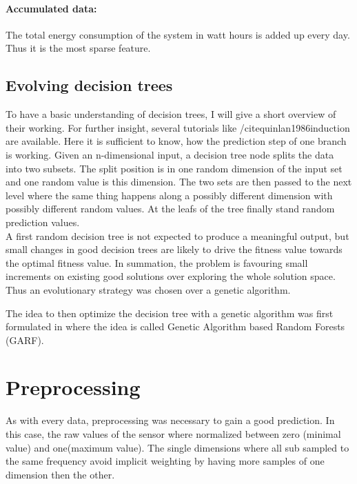 \documentclass[conference]{IEEEtran}
\begin{document}
\paragraph{Accumulated data:}
The total energy consumption of the system  in watt hours is added up every day. Thus it is the most sparse feature.


\subsection{Evolving decision trees}
\label{sec:GARF}

To have a basic understanding of decision trees, I will give a short overview of their working. For further insight, several tutorials like /cite{quinlan1986induction} are available. Here it is sufficient to know, how the prediction step of one branch is working. Given an n-dimensional input, a decision tree node splits the data into two subsets. The split position is in one random dimension of the input set and one random value is this dimension. The two sets are then passed to the next level where the same thing happens along a possibly different dimension with possibly different random values. At the leafs of the tree finally stand random prediction values.\\

A first random decision tree is not expected to produce a meaningful output, but small changes in good decision trees are likely to drive the fitness value towards the optimal fitness value. In summation, the problem is favouring small increments on existing good solutions over exploring the whole solution space. Thus an evolutionary strategy was chosen over a genetic algorithm.

The idea to then optimize the decision tree with a genetic algorithm was first formulated in \cite{bader2012garf} where the idea is called Genetic Algorithm based Random Forests (GARF).


\section{Preprocessing}
As with every data, preprocessing was necessary to gain a good prediction. In this case, the raw values of the sensor where normalized between zero (minimal value) and one(maximum value).
The single dimensions where all sub sampled to the same frequency avoid implicit weighting by having more samples of one dimension then the other.
\end{document}
